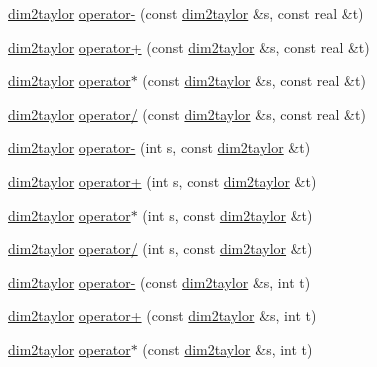 \begin{DoxyCompactItemize}
\item 
\hyperlink{classtaylor_1_1dim2taylor}{dim2taylor} \hyperlink{namespacetaylor_a583320e2035ee35796b1dc51d126a40e}{operator-\/} (const \hyperlink{classtaylor_1_1dim2taylor}{dim2taylor} \&s, const real \&t)
\item 
\hyperlink{classtaylor_1_1dim2taylor}{dim2taylor} \hyperlink{namespacetaylor_a6aba8d7ae778ad5a8def497a81f93492}{operator+} (const \hyperlink{classtaylor_1_1dim2taylor}{dim2taylor} \&s, const real \&t)
\item 
\hyperlink{classtaylor_1_1dim2taylor}{dim2taylor} \hyperlink{namespacetaylor_a3fab97783f44e1f70ee6a7b8ac7be6b9}{operator$\ast$} (const \hyperlink{classtaylor_1_1dim2taylor}{dim2taylor} \&s, const real \&t)
\item 
\hyperlink{classtaylor_1_1dim2taylor}{dim2taylor} \hyperlink{namespacetaylor_a83601375c928236047d6b8dc3158825c}{operator/} (const \hyperlink{classtaylor_1_1dim2taylor}{dim2taylor} \&s, const real \&t)
\item 
\hyperlink{classtaylor_1_1dim2taylor}{dim2taylor} \hyperlink{namespacetaylor_a75af8bfdf49bcf4578549a97b6516967}{operator-\/} (int s, const \hyperlink{classtaylor_1_1dim2taylor}{dim2taylor} \&t)
\item 
\hyperlink{classtaylor_1_1dim2taylor}{dim2taylor} \hyperlink{namespacetaylor_a0700323b633a69c7be77f26b66949859}{operator+} (int s, const \hyperlink{classtaylor_1_1dim2taylor}{dim2taylor} \&t)
\item 
\hyperlink{classtaylor_1_1dim2taylor}{dim2taylor} \hyperlink{namespacetaylor_a8437d42cd673464c45a80ba9550e6940}{operator$\ast$} (int s, const \hyperlink{classtaylor_1_1dim2taylor}{dim2taylor} \&t)
\item 
\hyperlink{classtaylor_1_1dim2taylor}{dim2taylor} \hyperlink{namespacetaylor_a7ad8547d33175b25f92470ef452be7e4}{operator/} (int s, const \hyperlink{classtaylor_1_1dim2taylor}{dim2taylor} \&t)
\item 
\hyperlink{classtaylor_1_1dim2taylor}{dim2taylor} \hyperlink{namespacetaylor_aa5a95b7e47b25250650f42f3aa9d3804}{operator-\/} (const \hyperlink{classtaylor_1_1dim2taylor}{dim2taylor} \&s, int t)
\item 
\hyperlink{classtaylor_1_1dim2taylor}{dim2taylor} \hyperlink{namespacetaylor_a59f1aebf6bfff7b2b294cd5d50f11f15}{operator+} (const \hyperlink{classtaylor_1_1dim2taylor}{dim2taylor} \&s, int t)
\item 
\hyperlink{classtaylor_1_1dim2taylor}{dim2taylor} \hyperlink{namespacetaylor_a7c14e8a638ba74fc191880a4eae70174}{operator$\ast$} (const \hyperlink{classtaylor_1_1dim2taylor}{dim2taylor} \&s, int t)

\end{DoxyCompactItemize}
